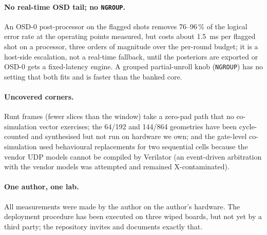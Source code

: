 \paragraph{No real-time OSD tail; no \texttt{NGROUP}.}
An OSD-0 post-processor on the flagged shots removes 76--96\,\% of the logical error rate at the
operating points measured, but costs about \SI{1.5}{\milli\second} per flagged shot on a processor,
three orders of magnitude over the per-round budget; it is a host-side escalation, not a real-time
fallback, until the posteriors are exported or OSD-0 gets a fixed-latency engine. A grouped partial-unroll knob
(\texttt{NGROUP}) has no setting that both fits and is faster than the banked core.

\paragraph{Uncovered corners.}
Runt frames (fewer slices than the window) take a zero-pad path that no co-simulation vector
exercises; the 64/192 and 144/864 geometries have been cycle-counted and synthesised but not run on
hardware we own; and the gate-level co-simulation used behavioural replacements for two sequential
cells because the vendor UDP models cannot be compiled by Verilator (an event-driven arbitration with
the vendor models was attempted and remained X-contaminated).

\paragraph{One author, one lab.}
All measurements were made by the author on the author's hardware. The deployment procedure has been
executed on three wiped boards, but not yet by a third party; the repository invites and documents
exactly that.
